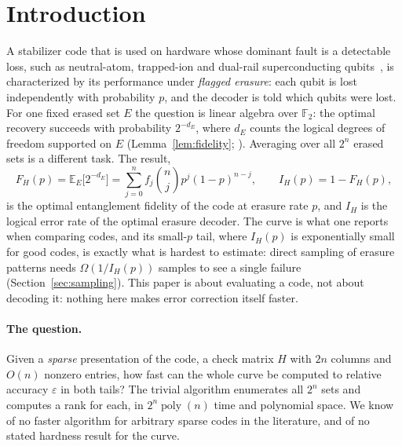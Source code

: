 \documentclass[11pt]{article}
\theoremstyle{remark}
\newcommand{\F}{\mathbb F_2}
\newcommand{\E}{\mathbb E}
\newcommand{\poly}{\operatorname{poly}}
\newcommand{\eps}{\varepsilon}
\begin{document}
\section{Introduction}
\label{sec:intro}

A stabilizer code that is used on hardware whose dominant fault is a
detectable loss, such as neutral-atom, trapped-ion and dual-rail
superconducting
qubits~\cite{wu2022erasure,kubica2023erasure,kang2023erasure,sahay2023biased},
is characterized by its performance under \emph{flagged erasure}: each
qubit is lost independently with probability \(p\), and the decoder is
told which qubits were lost. For one fixed erased set \(E\) the question
is linear algebra over \(\F\): the optimal recovery succeeds with
probability \(2^{-d_E}\), where \(d_E\) counts the logical degrees of
freedom supported on \(E\)
(Lemma~\ref{lem:fidelity}; \cite{delfossezemor2013,gullans2021}).
Averaging over all \(2^n\) erased sets is a different task. The result,
\[
 F_H(p)=\E_E\bigl[2^{-d_E}\bigr]
 =\sum_{j=0}^n f_j\binom njp^j(1-p)^{n-j},
 \qquad
 I_H(p)=1-F_H(p),
\]
is the optimal entanglement fidelity of the code at erasure rate \(p\),
and \(I_H\) is the logical error rate of the optimal erasure decoder.
The curve is what one reports when comparing codes, and its small-\(p\)
tail, where \(I_H(p)\) is exponentially small for good codes, is exactly
what is hardest to estimate: direct sampling of erasure patterns needs
\(\Omega(1/I_H(p))\) samples to see a single failure
(Section~\ref{sec:sampling}). This paper is about evaluating a code, not
about decoding it: nothing here makes error correction itself faster.

\paragraph{The question.}
Given a \emph{sparse} presentation of the code, a check matrix \(H\) with
\(2n\) columns and \(O(n)\) nonzero entries, how fast can the whole curve
be computed to relative accuracy \(\eps\) in both tails? The trivial
algorithm enumerates all \(2^n\) sets and computes a rank for each, in
\(2^n\poly(n)\) time and polynomial space. We know of no faster algorithm
for arbitrary sparse codes in the literature, and of no stated hardness
result for the curve.
\end{document}
